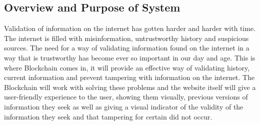 \subsection{Overview and Purpose of System}

Validation of information on the internet has gotten harder and harder with time.\\

\noindent
The internet is filled with misinformation, untrustworthy history and suspicious sources. 
The need for a way of validating information found on the internet in a way that is 
trustworthy has become ever so important in our day and age.
This is where Blockchain comes in, it will provide an effective way of validating
history, current information and prevent tampering with information on the internet.
The Blockchain will work with solving these problems and the website itself will give a 
user-friendly experience to the user, showing them visually, previous versions of information 
they seek as well as giving a visual indicator of the validity  of the information they seek 
and that tampering for certain did not occur.
